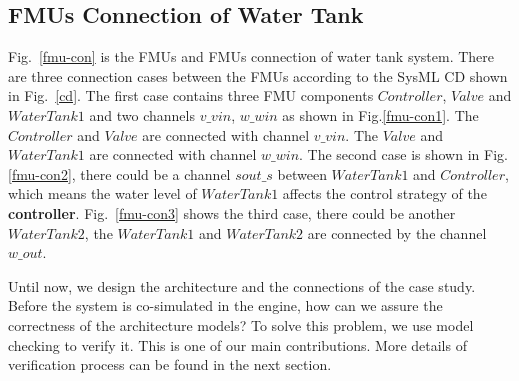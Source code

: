 \subsection{FMUs Connection of Water Tank}
Fig.~\ref{fmu-con} is the FMUs and FMUs connection of water tank system. There are three connection cases between the FMUs according to the SysML CD shown in Fig.~\ref{cd}. The first case contains three FMU components $Controller$, $Valve$ and $WaterTank1$ and two channels $v \_ vin$, $w \_ win$ as shown in Fig.\ref{fmu-con1}. The $Controller$ and $Valve$ are connected with channel $v \_ vin$. The $Valve$ and $WaterTank1$ are connected with channel $w \_ win$. The second case is shown in Fig.\ref{fmu-con2}, there could be a channel $sout \_ s$ between $WaterTank1$ and $Controller$, which means the water level of $WaterTank1$ affects the control strategy of the \textbf{controller}. Fig.~\ref{fmu-con3} shows the third case, there could be another $WaterTank2$, the $WaterTank1$ and $WaterTank2$ are connected by the channel $w \_ out$. 
\begin{figure}[htbp]
\end{figure}

Until now, we design the architecture and the connections of the case study. Before the system is co-simulated in the engine, how can we assure the correctness of the architecture models? To solve this problem, we use model checking to verify it. This is one of our main contributions. More details of verification process can be found in the next section.
